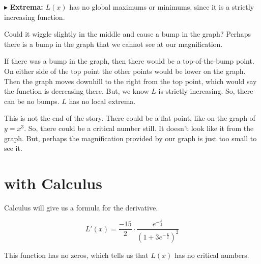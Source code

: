 \documentclass{ximera}
\begin{document}
$\blacktriangleright$ \textbf{Extrema:}  $L(x)$ has no global maximums or minimums, since it is a strictly increasing function.  


Could it wiggle slightly in the middle and cause a bump in the graph? Perhaps there is a bump in the graph that we cannot see at our magnification.

If there was a bump in the graph, then there would be a top-of-the-bump point.  On either side of the top point the other points would be lower on the graph.  Then the graph moves downhill to the right from the top point, which would say the function is decreasing there.  But, we know $L$ is strictly increasing.  So, there can be no bumps.  $L$ has no local extrema.


This is not the end of the story. There could be a flat point, like on the graph of $y = x^3$. So, there could be a critical number still.  It doesn't look like it from the graph. But, perhaps the magnification provided by our graph is just too small to see it.



\section{with Calculus}


Calculus will give us a formula for the derivative.

\[  L'(x) =   \frac{-15}{2} \cdot \frac{e^{-\tfrac{x}{2}}}{\left(1+3 e^{-\tfrac{x}{2}}\right)^2}    \]


This function has no zeros, which tells us that $L(x)$ has no critical numbers.
\end{document}
